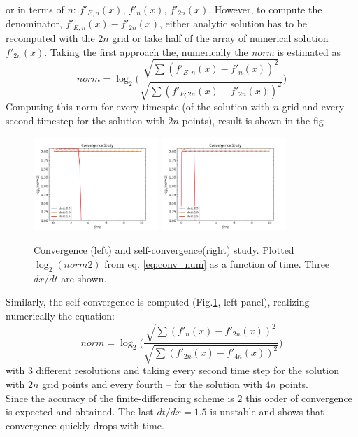 \documentclass{article}
\begin{document}
or in terms of $n$: $f'_{E,n}(x)$, $f'_{n}(x)$, $f'_{2n}(x)$. However, to compute the denominator, $f'_{E,n}(x) - f'_{2n}(x)$, either analytic solution has to be recomputed with the $2n$ grid or take half of the array of numerical solution $f'_{2n}(x)$. Taking the first approach the, numerically the \textit{norm} is estimated as 
\begin{equation}
norm = \log_2\Bigg( \frac{\sqrt{\sum( f' _{E;n}(x) - f' _{n}(x))^2}}{\sqrt{\sum( f' _{E;2n}(x) - f' _{2n}(x))^2}}\Bigg)
\label{eq:conv_num}
\end{equation}
Computing this norm for every timespte (of the solution with $n$ grid and every second timestep for the solution with $2n$ points), result is shown in the fig
\begin{figure}[t]
	\label{fig:conv_wave_eq}
	\centering 
	\includegraphics[width=0.42\textwidth]{./fig4/convergence_dxdt.png}
	\includegraphics[width=0.42\textwidth]{./fig4/self_convergence_dxdt.png}
	\caption{Convergence (left) and self-convergence(right) study. Plotted $\log_2(norm2)$ from eq. \ref{eq:conv_num} as a function of time. Three $dx/dt$ are shown. }
\end{figure}
Similarly, the self-convergence is computed (Fig.\ref{fig:conv_wave_eq}, left panel), realizing numerically the equation:
\begin{equation}
norm = \log_2\Bigg( \frac{\sqrt{\sum( f' _{n}(x) - f' _{2n}(x))^2}}{\sqrt{\sum( f' _{2n}(x) - f' _{4n}(x))^2}}\Bigg)
\label{eq:self_conv_num}
\end{equation}
with 3 different resolutions and taking every second time step for the solution with $2n$ grid points and every fourth -- for the solution with $4n$ points. \\
Since the accuracy of the finite-differencing scheme is $2$ this order of convergence is expected and obtained. The last $dt/dx=1.5$ is unstable and shows that convergence quickly drops with time.
%
\end{document}
